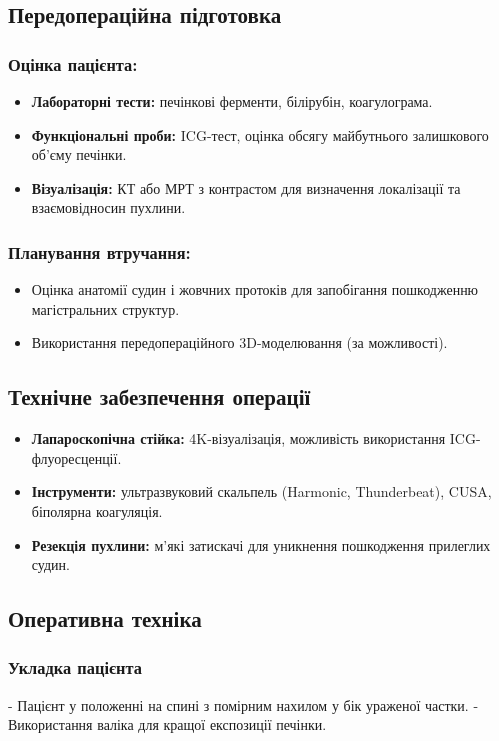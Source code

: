 \begin{refsection}
\subsection{Передопераційна підготовка}
\subsubsection{Оцінка пацієнта:}
\begin{itemize}
    \item \textbf{Лабораторні тести:} печінкові ферменти, білірубін, коагулограма.
    \item \textbf{Функціональні проби:} ICG-тест, оцінка обсягу майбутнього залишкового об'єму печінки.
    \item \textbf{Візуалізація:} КТ або МРТ з контрастом для визначення локалізації та взаємовідносин пухлини.
\end{itemize}

\subsubsection{Планування втручання:}
\begin{itemize}
    \item Оцінка анатомії судин і жовчних протоків для запобігання пошкодженню магістральних структур.
    \item Використання передопераційного 3D-моделювання (за можливості).
\end{itemize}

\subsection{Технічне забезпечення операції}
\begin{itemize}
    \item \textbf{Лапароскопічна стійка:} 4K-візуалізація, можливість використання ICG-флуоресценції.
    \item \textbf{Інструменти:} ультразвуковий скальпель (Harmonic, Thunderbeat), CUSA, біполярна коагуляція.
    \item \textbf{Резекція пухлини:} м'які затискачі для уникнення пошкодження прилеглих судин.
\end{itemize}

\subsection{Оперативна техніка}
\subsubsection{Укладка пацієнта}
- Пацієнт у положенні на спині з помірним нахилом у бік ураженої частки.
- Використання валіка для кращої експозиції печінки.


\end{refsection}
